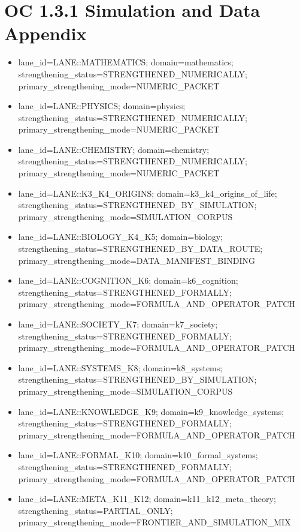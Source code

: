 \section{OC 1.3.1 Simulation and Data Appendix}
\begin{itemize}[leftmargin=*]
\item lane\_id=LANE::MATHEMATICS; domain=mathematics; strengthening\_status=STRENGTHENED\_NUMERICALLY; primary\_strengthening\_mode=NUMERIC\_PACKET
\item lane\_id=LANE::PHYSICS; domain=physics; strengthening\_status=STRENGTHENED\_NUMERICALLY; primary\_strengthening\_mode=NUMERIC\_PACKET
\item lane\_id=LANE::CHEMISTRY; domain=chemistry; strengthening\_status=STRENGTHENED\_NUMERICALLY; primary\_strengthening\_mode=NUMERIC\_PACKET
\item lane\_id=LANE::K3\_K4\_ORIGINS; domain=k3\_k4\_origins\_of\_life; strengthening\_status=STRENGTHENED\_BY\_SIMULATION; primary\_strengthening\_mode=SIMULATION\_CORPUS
\item lane\_id=LANE::BIOLOGY\_K4\_K5; domain=biology; strengthening\_status=STRENGTHENED\_BY\_DATA\_ROUTE; primary\_strengthening\_mode=DATA\_MANIFEST\_BINDING
\item lane\_id=LANE::COGNITION\_K6; domain=k6\_cognition; strengthening\_status=STRENGTHENED\_FORMALLY; primary\_strengthening\_mode=FORMULA\_AND\_OPERATOR\_PATCH
\item lane\_id=LANE::SOCIETY\_K7; domain=k7\_society; strengthening\_status=STRENGTHENED\_FORMALLY; primary\_strengthening\_mode=FORMULA\_AND\_OPERATOR\_PATCH
\item lane\_id=LANE::SYSTEMS\_K8; domain=k8\_systems; strengthening\_status=STRENGTHENED\_BY\_SIMULATION; primary\_strengthening\_mode=SIMULATION\_CORPUS
\item lane\_id=LANE::KNOWLEDGE\_K9; domain=k9\_knowledge\_systems; strengthening\_status=STRENGTHENED\_FORMALLY; primary\_strengthening\_mode=FORMULA\_AND\_OPERATOR\_PATCH
\item lane\_id=LANE::FORMAL\_K10; domain=k10\_formal\_systems; strengthening\_status=STRENGTHENED\_FORMALLY; primary\_strengthening\_mode=FORMULA\_AND\_OPERATOR\_PATCH
\item lane\_id=LANE::META\_K11\_K12; domain=k11\_k12\_meta\_theory; strengthening\_status=PARTIAL\_ONLY; primary\_strengthening\_mode=FRONTIER\_AND\_SIMULATION\_MIX
\end{itemize}
